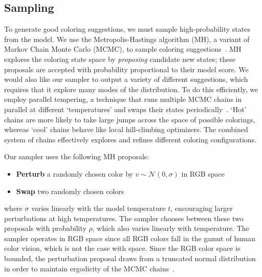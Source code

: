 \subsection{Sampling}
\label{sec:sampling}

To generate good coloring suggestions, we must sample high-probability states from the model. We use the Metropolis-Hastings algorithm (MH), a variant of Markov Chain Monte Carlo (MCMC), to sample coloring suggestions~\cite{Metropolis,Hastings}. MH explores the coloring state space by \emph{proposing} candidate new states; these proposals are accepted with probability proportional to their model score. We would also like our sampler to output a variety of different suggestions, which requires that it explore many modes of the distribution. To do this efficiently, we employ parallel tempering, a technique that runs multiple MCMC chains in parallel at different `temperatures' and swaps their states periodically~\cite{ParallelTempering}. `Hot' chains are more likely to take large jumps across the space of possible colorings, whereas `cool' chains behave like local hill-climbing optimizers. The combined system of chains effectively explores and refines different coloring configurations.

Our sampler uses the following MH proposals:
\begin{itemize}
	\item{\textbf{Perturb} a randomly chosen color by $v \sim \mathcal{N}(0, \sigma)$ in RGB space}
	\item{\textbf{Swap} two randomly chosen colors}
\end{itemize}
where $\sigma$ varies linearly with the model temperature $t$, encouraging larger perturbations at high temperatures. The sampler chooses between these two proposals with probability $\rho$, which also varies linearly with temperature. The sampler operates in RGB space since all RGB colors fall in the gamut of human color vision, which is not the case with \lab space. Since the RGB color space is bounded, the perturbation proposal draws from a truncated normal distribution in order to maintain ergodicity of the MCMC chains~\cite{TruncatedGaussians}.

